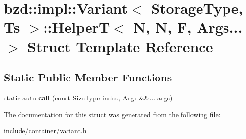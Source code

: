 \hypertarget{structbzd_1_1impl_1_1Variant_1_1HelperT_3_01N_00_01N_00_01F_00_01Args_8_8_8_01_4}{}\section{bzd\+:\+:impl\+:\+:Variant$<$ Storage\+Type, Ts $>$\+:\+:HelperT$<$ N, N, F, Args... $>$ Struct Template Reference}
\label{structbzd_1_1impl_1_1Variant_1_1HelperT_3_01N_00_01N_00_01F_00_01Args_8_8_8_01_4}
\subsection*{Static Public Member Functions}
\begin{DoxyCompactItemize}
\item 
\mbox{\label{structbzd_1_1impl_1_1Variant_1_1HelperT_3_01N_00_01N_00_01F_00_01Args_8_8_8_01_4_aff6bcb79a35bf71e33ba4e02382bb7bb}} 
static auto {\bfseries call} (const Size\+Type index, Args \&\&... args)
\end{DoxyCompactItemize}


The documentation for this struct was generated from the following file\+:\begin{DoxyCompactItemize}
\item 
include/container/variant.\+h\end{DoxyCompactItemize}
